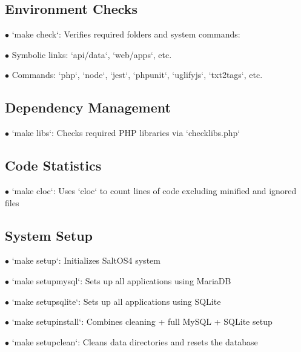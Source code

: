 \documentclass[a4paper]{article}
\begin{document}
\hypertarget{toc25}{}
\subsection{Environment Checks}

\begin{compactitem}
\item[\color{myblue}$\bullet$] `make check`: Verifies required folders and system commands:
  \begin{compactitem}
  \item[\color{myblue}$\bullet$] Symbolic links: `api/data`, `web/apps`, etc.
  \item[\color{myblue}$\bullet$] Commands: `php`, `node`, `jest`, `phpunit`, `uglifyjs`, `txt2tags`, etc.
  \end{compactitem}
\end{compactitem}

\hypertarget{toc26}{}
\subsection{Dependency Management}

\begin{compactitem}
\item[\color{myblue}$\bullet$] `make libs`: Checks required PHP libraries via `checklibs.php`
\end{compactitem}

\hypertarget{toc27}{}
\subsection{Code Statistics}

\begin{compactitem}
\item[\color{myblue}$\bullet$] `make cloc`: Uses `cloc` to count lines of code excluding minified and ignored files
\end{compactitem}

\hypertarget{toc28}{}
\subsection{System Setup}

\begin{compactitem}
\item[\color{myblue}$\bullet$] `make setup`: Initializes SaltOS4 system
\item[\color{myblue}$\bullet$] `make setupmysql`: Sets up all applications using MariaDB
\item[\color{myblue}$\bullet$] `make setupsqlite`: Sets up all applications using SQLite
\item[\color{myblue}$\bullet$] `make setupinstall`: Combines cleaning + full MySQL + SQLite setup
\item[\color{myblue}$\bullet$] `make setupclean`: Cleans data directories and resets the database
\end{compactitem}
\end{document}
